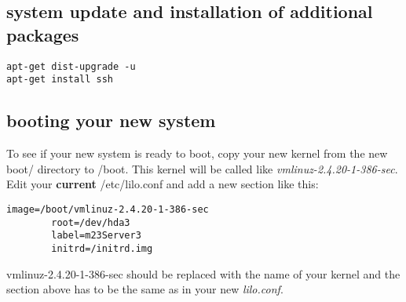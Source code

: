 \subsection{system update and installation of additional packages}
\begin{verbatim}
apt-get dist-upgrade -u
apt-get install ssh
\end{verbatim}

\subsection{booting your new system}
To see if your new system is ready to boot, copy your new kernel from the new boot/ directory to /boot. This kernel will be called like \textit{vmlinuz-2.4.20-1-386-sec}.
Edit your \textbf{current} /etc/lilo.conf and add a new section like this:
\begin{verbatim}
image=/boot/vmlinuz-2.4.20-1-386-sec
        root=/dev/hda3
        label=m23Server3
        initrd=/initrd.img
\end{verbatim}
vmlinuz-2.4.20-1-386-sec should be replaced with the name of your kernel and the section above has to be the same as in your new \textit{lilo.conf}.